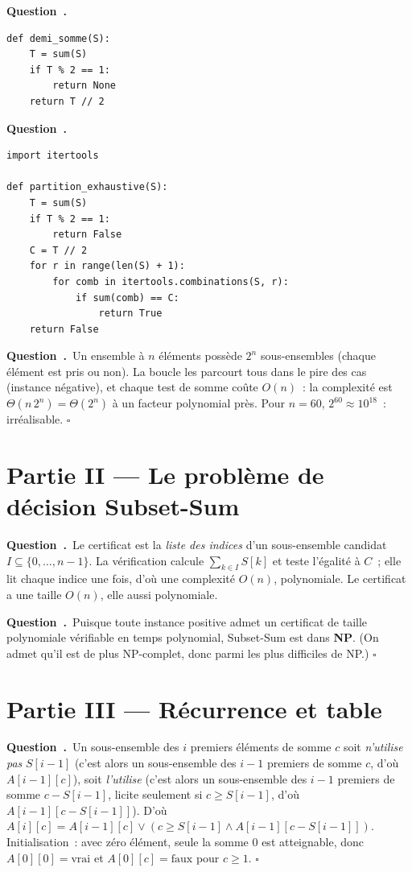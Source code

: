\documentclass[11pt,a4paper]{article}
\newcounter{qcnt}
\newcommand{\Q}{\medskip\par\stepcounter{qcnt}\noindent\textbf{Question~\theqcnt.}~}
\begin{document}
\Q
\begin{lstlisting}
def demi_somme(S):
    T = sum(S)
    if T % 2 == 1:
        return None
    return T // 2
\end{lstlisting}

\Q
\begin{lstlisting}
import itertools

def partition_exhaustive(S):
    T = sum(S)
    if T % 2 == 1:
        return False
    C = T // 2
    for r in range(len(S) + 1):
        for comb in itertools.combinations(S, r):
            if sum(comb) == C:
                return True
    return False
\end{lstlisting}

\Q Un ensemble à $n$ éléments possède $2^{n}$ sous-ensembles (chaque élément est pris ou non).
La boucle les parcourt tous dans le pire des cas (instance négative), et chaque test de somme
coûte $O(n)$~: la complexité est $\Theta(n\,2^{n}) = \Theta(2^{n})$ à un facteur polynomial près.
Pour $n=60$, $2^{60}\approx 10^{18}$~: irréalisable. $\square$

\section*{Partie II --- Le problème de décision Subset-Sum}

\Q Le certificat est la \emph{liste des indices} d'un sous-ensemble candidat $I \subseteq
\{0,\dots,n-1\}$. La vérification calcule $\sum_{k\in I} S[k]$ et teste l'égalité à $C$~; elle
lit chaque indice une fois, d'où une complexité $O(n)$, polynomiale. Le certificat a une taille
$O(n)$, elle aussi polynomiale.

\Q Puisque toute instance positive admet un certificat de taille polynomiale vérifiable en temps
polynomial, Subset-Sum est dans \textbf{NP}. (On admet qu'il est de plus NP-complet, donc parmi
les plus difficiles de NP.) $\square$

\section*{Partie III --- Récurrence et table}

\Q Un sous-ensemble des $i$ premiers éléments de somme $c$ soit \emph{n'utilise pas} $S[i-1]$
(c'est alors un sous-ensemble des $i-1$ premiers de somme $c$, d'où $A[i-1][c]$), soit
\emph{l'utilise} (c'est alors un sous-ensemble des $i-1$ premiers de somme $c-S[i-1]$, licite
seulement si $c \ge S[i-1]$, d'où $A[i-1][c-S[i-1]]$). D'où
$A[i][c] = A[i-1][c] \lor (c \ge S[i-1] \land A[i-1][c-S[i-1]])$. Initialisation~: avec zéro
élément, seule la somme $0$ est atteignable, donc $A[0][0]=\text{vrai}$ et $A[0][c]=\text{faux}$
pour $c\ge 1$. $\square$
\end{document}
